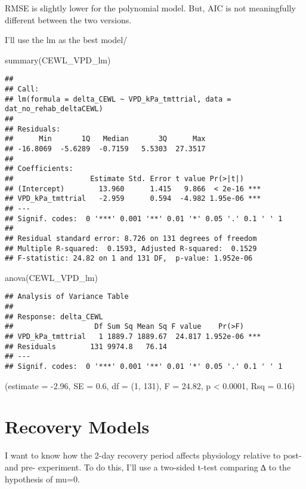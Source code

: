 \documentclass[
]{article}
\newenvironment{Shaded}{\begin{snugshade}}{\end{snugshade}}
\newcommand{\FunctionTok}[1]{\textcolor[rgb]{0.00,0.00,0.00}{#1}}
\newcommand{\NormalTok}[1]{#1}
\begin{document}
RMSE is slightly lower for the polynomial model. But, AIC is not
meaningfully different between the two versions.

I'll use the lm as the best model/

\begin{Shaded}
\begin{Highlighting}[]
\FunctionTok{summary}\NormalTok{(CEWL\_VPD\_lm)}
\end{Highlighting}
\end{Shaded}

\begin{verbatim}
## 
## Call:
## lm(formula = delta_CEWL ~ VPD_kPa_tmttrial, data = dat_no_rehab_deltaCEWL)
## 
## Residuals:
##      Min       1Q   Median       3Q      Max 
## -16.8069  -5.6289  -0.7159   5.5303  27.3517 
## 
## Coefficients:
##                  Estimate Std. Error t value Pr(>|t|)    
## (Intercept)        13.960      1.415   9.866  < 2e-16 ***
## VPD_kPa_tmttrial   -2.959      0.594  -4.982 1.95e-06 ***
## ---
## Signif. codes:  0 '***' 0.001 '**' 0.01 '*' 0.05 '.' 0.1 ' ' 1
## 
## Residual standard error: 8.726 on 131 degrees of freedom
## Multiple R-squared:  0.1593, Adjusted R-squared:  0.1529 
## F-statistic: 24.82 on 1 and 131 DF,  p-value: 1.952e-06
\end{verbatim}

\begin{Shaded}
\begin{Highlighting}[]
\FunctionTok{anova}\NormalTok{(CEWL\_VPD\_lm)}
\end{Highlighting}
\end{Shaded}

\begin{verbatim}
## Analysis of Variance Table
## 
## Response: delta_CEWL
##                   Df Sum Sq Mean Sq F value    Pr(>F)    
## VPD_kPa_tmttrial   1 1889.7 1889.67  24.817 1.952e-06 ***
## Residuals        131 9974.8   76.14                      
## ---
## Signif. codes:  0 '***' 0.001 '**' 0.01 '*' 0.05 '.' 0.1 ' ' 1
\end{verbatim}

(estimate = -2.96, SE = 0.6, df = (1, 131), F = 24.82, p \textless{}
0.0001, Rsq = 0.16)

\hypertarget{recovery-models}{%
\section{Recovery Models}\label{recovery-models}}

I want to know how the 2-day recovery period affects physiology relative
to post- and pre- experiment. To do this, I'll use a two-sided t-test
comparing ∆ to the hypothesis of mu=0.
\end{document}
